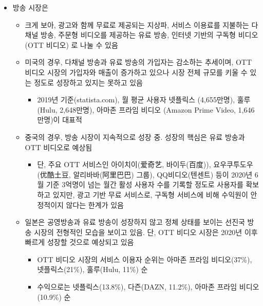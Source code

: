 \begin{itemize}
\begin{itemize}
		
	\item 방송 시장은
		\begin{itemize}
		\item 크게 보아, 광고와 함께 무료로 제공되는 지상파, 서비스 이용료를 지불하는 다채널 방송, 주문형 비디오를 제공하는 유료 방송, 인터넷 기반의 구독형 비디오(OTT 비디오) 로 나눌 수 있음
		\item 미국의 경우, 다채널 방송과 유료 방송의 가입자는 감소하는 추세이며, OTT 비디오 시장의 가입자와 매출이 증가하고 있으나 시장 전체 규모를 키울 수 있는 정도로 성장하고 있지는 못하고 있음
			\begin{itemize}
			\item 2019년 기준(statista.com), 월 평균 사용자 넷플릭스 (4,655만명), 훌루 (Hulu, 2,648만명), 아마존 프라임 비디오 (Amazon Prime Video, 1,646만명)이 대표적
			\end{itemize}
		\item 중국의 경우, 방송 시장이 지속적으로 성장 중. 성장의 핵심은 유료 방송과 OTT 비디오로 예상됨
			\begin{itemize}
			\item 단, 주요 OTT 서비스인 아이치이(爱奇艺, 바이두(百度)), 요우쿠투도우(优酷土豆, 알리바바(阿里巴巴) 그룹), QQ비디오(텐센트) 등이 2020년 6월 기준 3억명이 넘는 월간 활성 사용자 수를 기록할 정도로 사용자를 확보하고 있지만, 광고 기반 무료 서비스로, 구독형 서비스에 비해 수익원이 안정적이지 않다는 한계가 있음 %
			\end{itemize}
		\item 일본은 공영방송과 유료 방송이 성장하지 않고 정체 상태를 보이는 선진국 방송 시장의 전형적인 모습을 보이고 있음. 단, OTT 비디오 시장은 2020년 이후 빠르게 성장할 것으로 예상되고 있음
			\begin{itemize}
			\item OTT 비디오 시장의 서비스 이용자 순위는 아마존 프라임 비디오(37\%), 넷플릭스(21\%), 훌루(Hulu, 11\%) 순
			\item 수익으로는 넷플릭스(13.8\%), 다즌(DAZN, 11.2\%), 아마존 프라임 비디오(10.9\%) 순
			\end{itemize}
		\end{itemize}	


\end{itemize}
\end{itemize}
